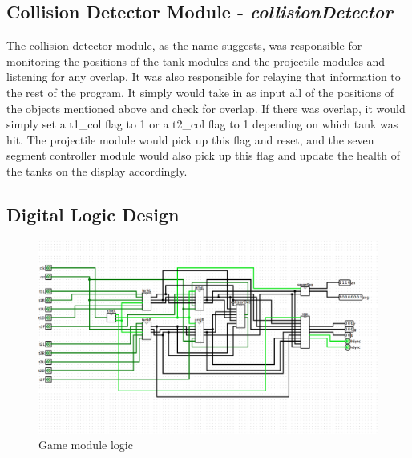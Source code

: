 \documentclass{article}
\begin{document}
\subsection*{Collision Detector Module - \textit{collisionDetector} }

The collision detector module, as the name suggests, was responsible for monitoring the positions of the tank modules and the projectile modules and listening for any overlap.  It was also responsible for relaying that information to the rest of the program. It simply would take in as input all of the positions of the objects mentioned above and check for overlap.  If there was overlap, it would simply set a t1\_col flag to 1 or a t2\_col flag to 1 depending on which tank was hit.  The projectile module would pick up this flag and reset, and the seven segment controller module would also pick up this flag and update the health of the tanks on the display accordingly.

\subsection*{Digital Logic Design}

\begin{figure}[H]
	\begin{center}
		\includegraphics[width=1\textwidth]{game.png} 
		\caption{Game module logic}
	\end{center}
\end{figure}
\end{document}
